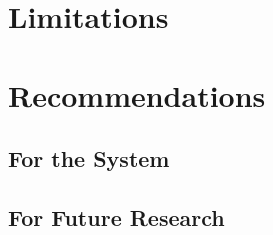 \section{Limitations}


\section{Recommendations}

\subsection{For the System}

\subsection{For Future Research}
